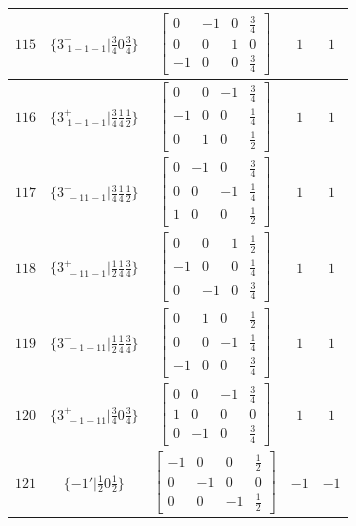 \documentclass[fleqn,8pt]{jsarticle}
\begin{document}
\begin{longtable}{ccccc}
$ 115 $ & $ \{3^{-}_{\,\,1-1-1}|\frac{3}{4} 0 \frac{3}{4}\} $ & $ \begin{bmatrix} 0 & -1 & 0 & \frac{3}{4} \\ 0 & 0 & 1 & 0 \\ -1 & 0 & 0 & \frac{3}{4} \end{bmatrix} $ & $ 1 $ & $ 1 $ \\ \hline
$ 116 $ & $ \{3^{+}_{\,\,1-1-1}|\frac{3}{4} \frac{1}{4} \frac{1}{2}\} $ & $ \begin{bmatrix} 0 & 0 & -1 & \frac{3}{4} \\ -1 & 0 & 0 & \frac{1}{4} \\ 0 & 1 & 0 & \frac{1}{2} \end{bmatrix} $ & $ 1 $ & $ 1 $ \\ \hline
$ 117 $ & $ \{3^{-}_{\,\,-11-1}|\frac{3}{4} \frac{1}{4} \frac{1}{2}\} $ & $ \begin{bmatrix} 0 & -1 & 0 & \frac{3}{4} \\ 0 & 0 & -1 & \frac{1}{4} \\ 1 & 0 & 0 & \frac{1}{2} \end{bmatrix} $ & $ 1 $ & $ 1 $ \\ \hline
$ 118 $ & $ \{3^{+}_{\,\,-11-1}|\frac{1}{2} \frac{1}{4} \frac{3}{4}\} $ & $ \begin{bmatrix} 0 & 0 & 1 & \frac{1}{2} \\ -1 & 0 & 0 & \frac{1}{4} \\ 0 & -1 & 0 & \frac{3}{4} \end{bmatrix} $ & $ 1 $ & $ 1 $ \\ \hline
$ 119 $ & $ \{3^{-}_{\,\,-1-11}|\frac{1}{2} \frac{1}{4} \frac{3}{4}\} $ & $ \begin{bmatrix} 0 & 1 & 0 & \frac{1}{2} \\ 0 & 0 & -1 & \frac{1}{4} \\ -1 & 0 & 0 & \frac{3}{4} \end{bmatrix} $ & $ 1 $ & $ 1 $ \\ \hline
$ 120 $ & $ \{3^{+}_{\,\,-1-11}|\frac{3}{4} 0 \frac{3}{4}\} $ & $ \begin{bmatrix} 0 & 0 & -1 & \frac{3}{4} \\ 1 & 0 & 0 & 0 \\ 0 & -1 & 0 & \frac{3}{4} \end{bmatrix} $ & $ 1 $ & $ 1 $ \\ \hline
$ 121 $ & $ \{-1{}'|\frac{1}{2} 0 \frac{1}{2}\} $ & $ \begin{bmatrix} -1 & 0 & 0 & \frac{1}{2} \\ 0 & -1 & 0 & 0 \\ 0 & 0 & -1 & \frac{1}{2} \end{bmatrix} $ & $ -1 $ & $ -1 $ \\ \hline

\end{longtable}
\end{document}
